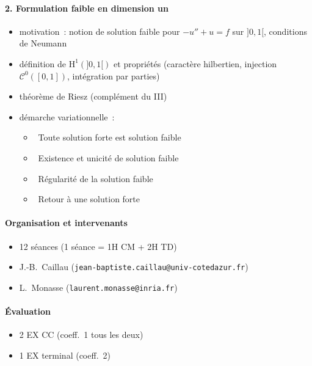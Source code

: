 \documentclass[11pt,a4paper]{article}
\def\CC{\mathscr{C}}
\def\H{\mathrm{H}}
\theoremstyle{plain}
\theoremstyle{definition}
\begin{document}
\paragraph{2. Formulation faible en dimension un}
\begin{itemize}
\item motivation~: notion de solution faible pour $-u''+u=f$ sur $]0,1[$, conditions
de Neumann
\item d\'efinition de $\H^1(]0,1[)$ et propri\'et\'es (caract\`ere hilbertien,
injection $\CC^0([0,1])$, int\'egration par parties)
\item th\'eor\`eme de Riesz (compl\'ement du III)
\item d\'emarche variationnelle~:
\begin{itemize}
\item[A.]~Toute solution forte est solution faible
\item[B.]~Existence et unicit\'e de solution faible
\item[C.]~R\'egularit\'e de la solution faible
\item[D.]~Retour \`a une solution forte
\end{itemize}
\end{itemize}

\paragraph{Organisation et intervenants}

\begin{itemize}
  \item 12 s\'eances (1 s\'eance = 1H CM + 2H TD)
  \item J.-B.~Caillau (\verb+jean-baptiste.caillau@univ-cotedazur.fr+)
  \item L.~Monasse (\verb+laurent.monasse@inria.fr+)
\end{itemize}

\paragraph{\'Evaluation}
\begin{itemize}
  \item 2 EX CC (coeff.\ 1 tous les deux) 
  \item 1 EX terminal (coeff.\ 2)
\end{itemize}

\end{document}
